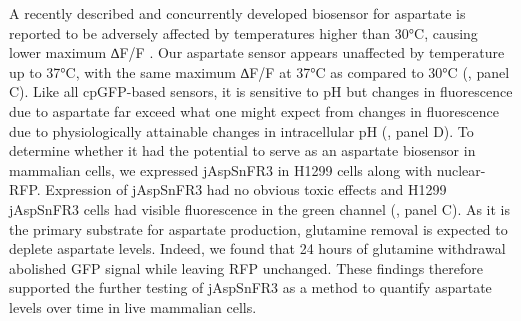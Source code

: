 \documentclass[9pt,lineno]{elife}
\begin{document}
A recently described and concurrently developed biosensor for aspartate is reported to be adversely affected by temperatures higher than 30°C, causing lower maximum ∆F/F \citep{Hellweg2023}.
Our aspartate sensor appears unaffected by temperature up to 37°C, with the same maximum ∆F/F at 37°C as compared to 30°C (, panel C).
Like all cpGFP-based sensors, it is sensitive to pH but changes in fluorescence due to aspartate far exceed what one might expect from changes in fluorescence due to physiologically attainable changes in intracellular pH (, panel D).
To determine whether it had the potential to serve as an aspartate biosensor in mammalian cells, we expressed jAspSnFR3 in H1299 cells along with nuclear-RFP.
Expression of jAspSnFR3 had no obvious toxic effects and H1299 jAspSnFR3 cells had visible fluorescence in the green channel (, panel C).
As it is the primary substrate for aspartate production, glutamine removal is expected to deplete aspartate levels.
Indeed, we found that 24 hours of glutamine withdrawal abolished GFP signal while leaving RFP unchanged.
These findings therefore supported the further testing of jAspSnFR3 as a method to quantify aspartate levels over time in live mammalian cells.
\end{document}
